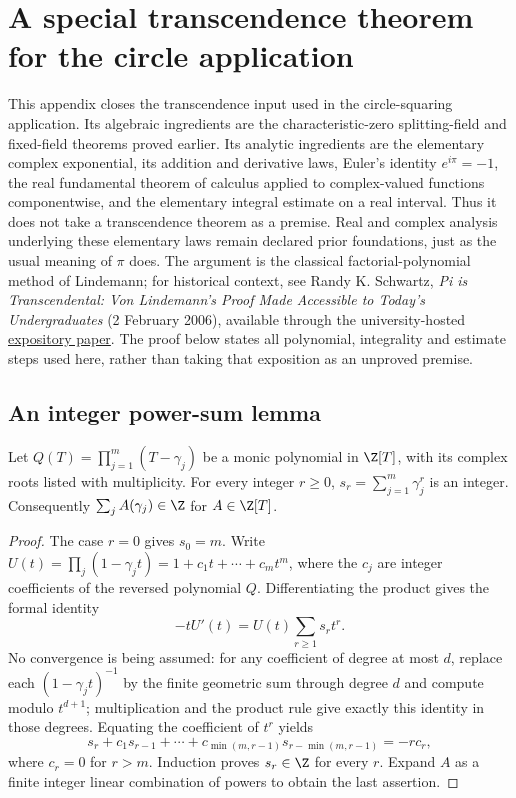 \chapter{A special transcendence theorem for the circle application}
\label{app:pi-transcendence}
This appendix closes the transcendence input used in the circle-squaring
application. Its algebraic ingredients are the characteristic-zero
splitting-field and fixed-field theorems proved earlier. Its analytic
ingredients are the elementary complex exponential, its addition and
derivative laws, Euler's identity $e^{i\pi}=-1$, the real fundamental
theorem of calculus applied to complex-valued functions componentwise,
and the elementary integral estimate on a real interval. Thus it does
not take a transcendence theorem as a premise. Real and complex
analysis underlying these elementary laws remain declared prior
foundations, just as the usual meaning of $\pi$ does.
The argument is the classical factorial-polynomial method of Lindemann;
for historical context, see Randy K. Schwartz, \emph{Pi is Transcendental:
Von Lindemann's Proof Made Accessible to Today's Undergraduates}
(2 February 2006), available through the university-hosted
\href{https://home.agh.edu.pl/rudol/Pi_TranscendentalLindemann.pdf}{expository paper}.
The proof below states all polynomial, integrality and estimate steps
used here, rather than taking that exposition as an unproved premise.

\section{An integer power-sum lemma}
\begin{lemma}\label{lem:integer-power-sums}
Let $Q(T)=\prod_{j=1}^m(T-\gamma_j)$ be a monic polynomial in
$\Z[T]$, with its complex roots listed with multiplicity. For every
integer $r\ge0$, $s_r=\sum_{j=1}^m\gamma_j^r$ is an integer.
Consequently $\sum_j A(\gamma_j)\in\Z$ for $A\in\Z[T]$.
\end{lemma}
\begin{proof}
The case $r=0$ gives $s_0=m$. Write
$U(t)=\prod_j(1-\gamma_jt)=1+c_1t+\cdots+c_mt^m$, where
the $c_j$ are integer coefficients of the reversed polynomial $Q$.
Differentiating the product gives the formal identity
\[
 -tU'(t)=U(t)\sum_{r\ge1}s_rt^r.
\]
No convergence is being assumed: for any coefficient of degree at
most $d$, replace each $(1-\gamma_jt)^{-1}$ by the finite geometric
sum through degree $d$ and compute modulo $t^{d+1}$; multiplication
and the product rule give exactly this identity in those degrees.
Equating the coefficient of $t^r$ yields
\[
 s_r+c_1s_{r-1}+\cdots+c_{\min(m,r-1)}s_{r-\min(m,r-1)}
       =-r c_r,
\]
where $c_r=0$ for $r>m$. Induction proves $s_r\in\Z$ for every
$r$. Expand $A$ as a finite integer linear combination of powers to
obtain the last assertion.
\end{proof}

